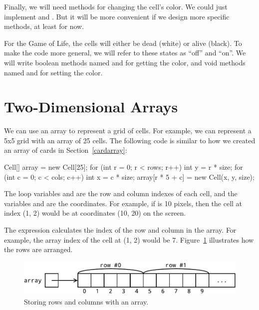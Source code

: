 Finally, we will need methods for changing the cell's color.
We could just implement  and .
But it will be more convenient if we design more specific methods, at least for now.

For the Game of Life, the cells will either be dead (white) or alive (black).
To make the code more general, we will refer to these states as ``off'' and ``on''.
We will write boolean methods named  and  for getting the color, and void methods named  and  for setting the color.

%


\section{Two-Dimensional Arrays}

We can use an array to represent a grid of cells.
For example, we can represent a 5x5 grid with an array of 25 cells.
The following code is similar to how we created an array of cards in Section~\ref{cardarray}:

\begin{code}
Cell[] array = new Cell[25];
for (int r = 0; r < rows; r++) {
    int y = r * size;
    for (int c = 0; c < cols; c++) {
        int x = c * size;
        array[r * 5 + c] = new Cell(x, y, size);
    }
}
\end{code}

The loop variables  and  are the row and column indexes of each cell, and the variables  and  are the coordinates.
For example, if  is 10 pixels, then the cell at index (1, 2) would be at coordinates (10, 20) on the screen.

The expression  calculates the index of the row and column in the array.
For example, the array index of the cell at (1, 2) would be 7.
Figure~\ref{fig:1D-array} illustrates how the rows are arranged.

\begin{figure}[!ht]
\begin{center}
\includegraphics[width=366pt]{figs/1D-array.pdf}
\caption{Storing rows and columns with an array.}
\label{fig:1D-array}
\end{center}
\end{figure}

